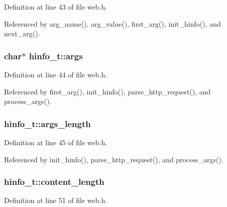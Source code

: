 Definition at line 43 of file web.\-h.



Referenced by arg\-\_\-name(), arg\-\_\-value(), first\-\_\-arg(), init\-\_\-hinfo(), and next\-\_\-arg().

\hypertarget{structhinfo__t_a62bf198b939a9d932bcac763ebc51443}{
\subsubsection[{args}]{\setlength{\rightskip}{0pt plus 5cm}char$\ast$ hinfo\-\_\-t\-::args}}\label{structhinfo__t_a62bf198b939a9d932bcac763ebc51443}


Definition at line 44 of file web.\-h.



Referenced by first\-\_\-arg(), init\-\_\-hinfo(), parse\-\_\-http\-\_\-request(), and process\-\_\-args().

\hypertarget{structhinfo__t_a003130c9489dfe54a76df23a85fae62f}{
\subsubsection[{args\-\_\-length}]{ hinfo\-\_\-t\-::args\-\_\-length}}\label{structhinfo__t_a003130c9489dfe54a76df23a85fae62f}


Definition at line 45 of file web.\-h.



Referenced by init\-\_\-hinfo(), parse\-\_\-http\-\_\-request(), and process\-\_\-args().

\hypertarget{structhinfo__t_a6cf5714c0fe8e8e7f7819194274f9052}{
\subsubsection[{content\-\_\-length}]{ hinfo\-\_\-t\-::content\-\_\-length}}\label{structhinfo__t_a6cf5714c0fe8e8e7f7819194274f9052}


Definition at line 51 of file web.\-h.



